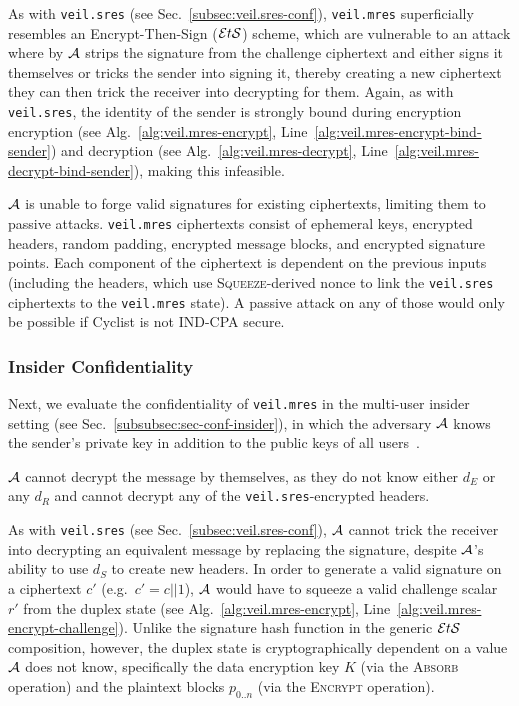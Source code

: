As with \texttt{veil.sres} (see Sec.~\ref{subsec:veil.sres-conf}), \texttt{veil.mres} superficially resembles an
Encrypt-Then-Sign ($\mathcal{E}t\mathcal{S}$) scheme, which are vulnerable to an attack where by $\mathcal{A}$ strips the signature from the
challenge ciphertext and either signs it themselves or tricks the sender into signing it, thereby creating a new
ciphertext they can then trick the receiver into decrypting for them.
Again, as with \texttt{veil.sres}, the identity of the sender is strongly bound during encryption
encryption (see Alg.~\ref{alg:veil.mres-encrypt}, Line~\ref{alg:veil.mres-encrypt-bind-sender}) and decryption
(see Alg.~\ref{alg:veil.mres-decrypt}, Line~\ref{alg:veil.mres-decrypt-bind-sender}), making this infeasible.

$\mathcal{A}$ is unable to forge valid signatures for existing ciphertexts, limiting them to passive attacks.
\texttt{veil.mres} ciphertexts consist of ephemeral keys, encrypted headers, random padding, encrypted message blocks,
and encrypted signature points.
Each component of the ciphertext is dependent on the previous inputs (including the headers, which use
\textsc{Squeeze}-derived nonce to link the \texttt{veil.sres} ciphertexts to the \texttt{veil.mres} state).
A passive attack on any of those would only be possible if Cyclist is not IND-CPA secure.

\subsubsection{Insider Confidentiality}

Next, we evaluate the confidentiality of \texttt{veil.mres} in the multi-user insider setting
(see Sec.~\ref{subsubsec:sec-conf-insider}), in which the adversary $\mathcal{A}$ knows the sender's private key in
addition to the public keys of all users~\cite[p. 45--46]{baek2010}.

$\mathcal{A}$ cannot decrypt the message by themselves, as they do not know either $d_E$ or any $d_R$ and cannot decrypt
any of the \texttt{veil.sres}-encrypted headers.

As with \texttt{veil.sres} (see Sec.~\ref{subsec:veil.sres-conf}),
$\mathcal{A}$ cannot trick the receiver into decrypting an equivalent message by replacing the signature, despite
$\mathcal{A}$'s ability to use $d_S$ to create new headers.
In order to generate a valid signature on a ciphertext $c'$ (e.g.\ $c'=c||1$), $\mathcal{A}$ would have to squeeze a
valid challenge scalar $r'$ from the duplex state (see Alg.~\ref{alg:veil.mres-encrypt},
Line~\ref{alg:veil.mres-encrypt-challenge}).
Unlike the signature hash function in the generic $\mathcal{E}t\mathcal{S}$ composition, however, the duplex state is cryptographically
dependent on a value $\mathcal{A}$ does not know, specifically the data encryption key $K$ (via the \textsc{Absorb}
operation) and the plaintext blocks $p_{0..n}$ (via the \textsc{Encrypt} operation).

